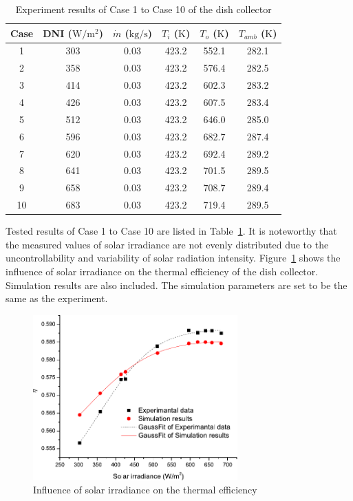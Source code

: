\begin{table}[htbp]\footnotesize
	\caption{Experiment results of Case 1 to Case 10 of the dish collector}
	\begin{center}
	\begin{tabular}{cccccc}
		\toprule
		Case	& DNI ($\mathrm{W/m^2}$)	&	$\dot{m}$ ($\mathrm{kg/s}$)			&	$T_i$ ($\mathrm{K}$)	&	$T_o$ ($\mathrm{K}$)		&	$T_{amb}$ ($\mathrm{K}$)\\
		\midrule
		1	&	303	&	0.03	&	423.2	&	552.1	&	282.1\\
		2	&	358	&	0.03	&	423.2	&	576.4	&	282.5\\
		3	&	414	&	0.03	&	423.2	&	602.3	&	283.2	\\
		4	&	426	&	0.03	&	423.2	&	607.5	&	283.4\\
		5	&	512	&	0.03	&	423.2	&	646.0	&	285.0\\
		6	&	596	&	0.03	&	423.2	&	682.7	&	287.4\\
		7	&	620	&	0.03	&	423.2	&	692.4	&	289.2\\
		8	&	641	&	0.03	&	423.2	&	701.5	&	289.5\\
		9	&	658	&	0.03	&	423.2	&	708.7	&	289.4\\
		10	&	683	&	0.03	&	423.2	&	719.4	&	289.5\\
		\bottomrule
	\end{tabular}
	\end{center}
	\label{tab:ResultOfDish1}
\end{table}
Tested results of Case 1 to Case 10 are listed in Table~\ref{tab:ResultOfDish1}. It is noteworthy that the measured values of solar irradiance are not evenly distributed due to the uncontrollability and variability of solar radiation intensity.
Figure~\ref{fig:I_r-eta-dish} shows the influence of solar irradiance on the thermal efficiency of the dish collector. Simulation results are also included. The simulation parameters are set to be the same as the experiment. 
\begin{figure}[!ht]
\centering
\includegraphics[width=0.7\textwidth]{fig/I_r-eta-dish}
\caption{Influence of solar irradiance on the thermal efficiency}
\label{fig:I_r-eta-dish}
\end{figure}

